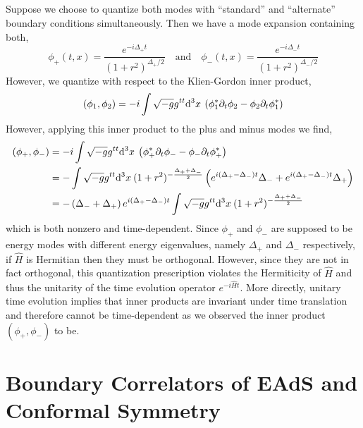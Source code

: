 \documentclass[12pt]{article}
\begin{document}
\subsection{}

Suppose we choose to quantize both modes with ``standard'' and ``alternate'' boundary conditions simultaneously. Then we have a mode expansion containing both,
\[ \phi_{+}(t,x) = \frac{e^{- i \Delta_{+} t}}{(1 + r^2)^{\Delta_{+}/2}} \quad \text{and} \quad \phi_{-}(t,x) = \frac{e^{- i \Delta_{-} t}}{(1 + r^2)^{\Delta_{-}/2}} \]
However, we quantize with respect to the Klien-Gordon inner product,
\[ (\phi_1, \phi_2) = - i \int \sqrt{-g} g^{tt} \mathrm{d}^{3} x \: \left( \phi_1^* \partial_t \phi_2 - \phi_2 \partial_t \phi_1^* \right) \]
However, applying this inner product to the plus and minus modes we find,
\begin{align*} 
(\phi_+, \phi_-) 
& = - i \int \sqrt{-g} g^{tt} \mathrm{d}^{3} x \: \left( \phi_{+}^* \partial_t \phi_{-} - \phi_{-} \partial_t \phi_{+}^* \right)
\\
& = - \int \sqrt{-g} g^{tt} \mathrm{d}^{3} x \: (1 + r^2)^{-\frac{\Delta_{+} + \Delta_{-}}{2}} \left( e^{i (\Delta_{+} - \Delta_{-} ) t} \Delta_{-} + e^{i (\Delta_{+} - \Delta_{-} ) t} \Delta_{+} \right)
\\
& = - \left(  \Delta_{-} +  \Delta_{+} \right) e^{i (\Delta_{+} - \Delta_{-} ) t} \int \sqrt{-g} g^{tt} \mathrm{d}^{3} x \: (1 + r^2)^{-\frac{\Delta_{+} + \Delta_{-}}{2}} 
\end{align*}
which is both nonzero and time-dependent. Since $\phi_{+}$ and $\phi_{-}$ are supposed to be energy modes with different energy eigenvalues, namely $\Delta_{+}$ and $\Delta_{-}$ respectively, if $\hat{H}$ is Hermitian then they must be orthogonal. However, since they are not in fact orthogonal, this quantization prescription violates the Hermiticity of $\hat{H}$ and thus the unitarity of the time evolution operator $e^{- i \hat{H} t}$. More directly, unitary time evolution implies that inner products are invariant under time translation and therefore cannot be time-dependent as we observed the inner product $(\phi_+, \phi_-)$ to be. 

\section{Boundary Correlators of EAdS and Conformal Symmetry}

\subsection{}
\end{document}
